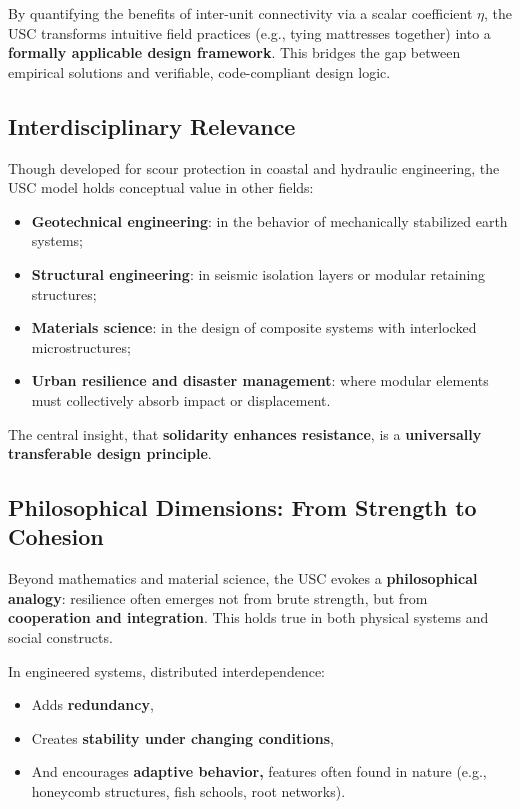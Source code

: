 \documentclass[Journal,letterpaper]{ascelike-new}
\begin{document}
By quantifying the benefits of inter-unit connectivity via a scalar coefficient $\eta $, the USC transforms intuitive field practices (e.g., tying mattresses together) into a \textbf{formally applicable design framework}. This bridges the gap between empirical solutions and verifiable, code-compliant design logic.

\subsection{Interdisciplinary Relevance}

Though developed for scour protection in coastal and hydraulic engineering, the USC model holds conceptual value in other fields:

\begin{itemize}
\item  \textbf{Geotechnical engineering}: in the behavior of mechanically stabilized earth systems;

\item  \textbf{Structural engineering}: in seismic isolation layers or modular retaining structures;

\item  \textbf{Materials science}: in the design of composite systems with interlocked microstructures;

\item  \textbf{Urban resilience and disaster management}: where modular elements must collectively absorb impact or displacement.
\end{itemize}

The central insight, that \textbf{solidarity enhances resistance}, is a \textbf{universally transferable design principle}.

\subsection{Philosophical Dimensions: From Strength to Cohesion}

Beyond mathematics and material science, the USC evokes a \textbf{philosophical analogy}: resilience often emerges not from brute strength, but from \textbf{cooperation and integration}. This holds true in both physical systems and social constructs.

In engineered systems, distributed interdependence:

\begin{itemize}
\item  Adds \textbf{redundancy},

\item  Creates \textbf{stability under changing conditions},

\item  And encourages \textbf{adaptive behavior, }features often found in nature (e.g., honeycomb structures, fish schools, root networks).
\end{itemize}
\end{document}
